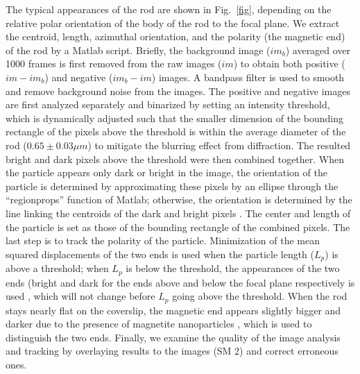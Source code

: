\documentclass[aps,prl,twocolumn,groupedaddress]{revtex4}
\begin{document}
The typical appearances of the rod are shown in Fig.\ \ref{fig}, depending on the relative polar orientation of the body of the rod to the focal plane. We extract the centroid,  length, azimuthal orientation, and the polarity (the magnetic end) of the rod by a Matlab script. Briefly, the background image ($im_b$) averaged over 1000 frames is first removed from the raw images ($im$) to obtain both positive ($im-im_b$) and negative ($im_b-im$) images. A bandpass filter is used to smooth and remove background noise \cite{Crocker1996,Gao2009} from the  images. The positive and negative images are first analyzed separately and binarized by setting an intensity threshold, which is dynamically adjusted such that the smaller dimension of the bounding rectangle of the pixels above the threshold is within the average diameter of the rod ($0.65\pm 0.03 \mu m$) to mitigate the blurring effect from diffraction. The resulted bright and dark pixels above the threshold were then combined together. When the particle appears only dark or bright in the image, the orientation of the particle is determined by approximating these pixels by an ellipse through the ``regionprops'' function of Matlab; otherwise, the orientation is determined by the line linking the centroids of the dark and bright pixels \cite{Gao2009}. The center and length of the particle is set as those of the bounding rectangle of the combined pixels. The last step is to track the polarity of the particle. Minimization of the mean squared displacements of the two ends is used when the particle length ($L_p$) is above a threshold; when $L_p$ is below the threshold, the appearances of the two ends (bright and dark for the ends above and below the focal plane respectively is used \cite{Curtis2002,Lee2007}, which will not change before $L_p$  going above the  threshold. When the rod stays nearly flat on the coverslip, the magnetic end appears slightly bigger and darker due to the presence of magnetite nanoparticles , which is used to distinguish the two ends. Finally, we examine the quality of the image analysis and tracking by overlaying results to the images (SM 2) and correct erroneous ones. 

\end{document}

